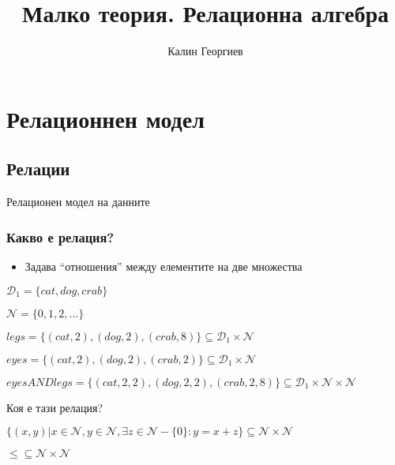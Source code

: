 \documentclass{beamer}
\begin{document}
\title[Увод в програмирането]{Малко теория. Релационна алгебра} 
\author{Калин Георгиев} 
\frame{\titlepage} 

\section{Релационнен модел} 
\subsection{Релации}


\begin{frame}
\centerline{Релационен модел на данните}
\end{frame}

\begin{frame}[fragile]
\frametitle{Какво е релация?}

\begin{itemize}
  \item Задава ``отношения'' между елементите на две множества 
\end{itemize}

\vspace{1em}

$\mathcal{D}_1=\{cat,dog,crab\}$

$\mathcal{N}=\{0,1,2,...\}$

\vspace{1em}

$legs=\{(cat,2),(dog,2),(crab,8)\} \subseteq \mathcal{D}_1 \times \mathcal{N}$

\vspace{1em}

$eyes=\{(cat,2),(dog,2),(crab,2)\} \subseteq \mathcal{D}_1 \times \mathcal{N}$


\vspace{1em}

$eyesANDlegs=\{(cat,2,2),(dog,2,2),(crab,2,8)\} \subseteq \mathcal{D}_1 \times \mathcal{N} \times \mathcal{N}$

\vspace{1em}

Коя е тази релация?

$\{(x,y)|x \in \mathcal{N}, y \in \mathcal{N}, \exists z \in \mathcal{N}-\{0\}:y=x+z\} \subseteq \mathcal{N} \times \mathcal {N}$


\pause

\begin{center}
  $\leq \subseteq \mathcal{N} \times \mathcal{N}$
\end{center}

\end{frame}
\end{document}
